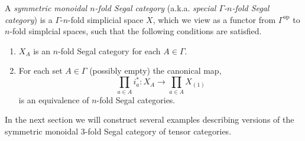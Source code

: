 \documentclass{amsart}
\begin{document}
\begin{definition}
	A {\em symmetric monoidal $n$-fold Segal category} (a.k.a. {\em special $\Gamma$-$n$-fold Segal category}) is a $\Gamma$-$n$-fold simplicial space $X$, which we view as a functor from $\Gamma^\textrm{op}$ to $n$-fold simplcial spaces, such that the following conditions are satisfied. 
	\begin{enumerate}
		\item $X_A$ is an $n$-fold Segal category for each $A \in \Gamma$. 
		\item For each set $A \in \Gamma$ (possibly empty) the canonical map,
		\begin{equation*}
			\prod_{a \in A} i_a^*: X_A \to \prod_{a \in A} X_{(1)}
		\end{equation*}
		is an equivalence of $n$-fold Segal categories. %
	\end{enumerate}
\end{definition}

In the next section we will construct several examples describing versions of the symmetric monoidal 3-fold Segal category of tensor categories. 

\end{document}
